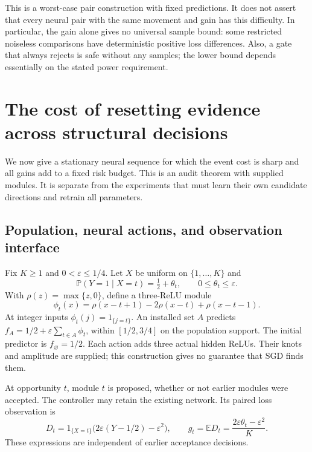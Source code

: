 This is a worst-case pair construction with fixed predictions. It does not
assert that every neural pair with the same movement and gain has this
difficulty. In particular, the gain alone gives no universal sample bound:
some restricted noiseless comparisons have deterministic positive loss
differences. Also, a gate that always rejects is safe without any samples;
the lower bound depends essentially on the stated power requirement.

\section{The cost of resetting evidence across structural decisions}
\label{sec:reset-theory}

We now give a stationary neural sequence for which the event cost is
sharp and all gains add to a fixed risk budget. This is an audit theorem
with supplied modules. It is separate from the experiments that must learn
their own candidate directions and retrain all parameters.

\subsection{Population, neural actions, and observation interface}

Fix $K\ge1$ and $0<\varepsilon\le1/4$. Let $X$ be uniform on
$\{1,\ldots,K\}$ and
\begin{equation}
 \mathbb P(Y=1\mid X=t)=\tfrac12+\theta_t,
 \qquad 0\le\theta_t\le\varepsilon.
 \label{eq:module-law}
\end{equation}
With $\rho(z)=\max\{z,0\}$, define a three-ReLU module
\begin{equation}
 \phi_t(x)=\rho(x-t+1)-2\rho(x-t)+\rho(x-t-1).
 \label{eq:relu-module}
\end{equation}
At integer inputs $\phi_t(j)=1_{\{j=t\}}$.
An installed set $A$ predicts
$f_A=1/2+\varepsilon\sum_{t\in A}\phi_t$, within $[1/2,3/4]$ on the
population support. The initial predictor is $f_\varnothing=1/2$.
Each action adds three actual hidden ReLUs. Their knots and amplitude
are supplied; this construction gives no guarantee that SGD finds them.

At opportunity $t$, module $t$ is proposed, whether or not earlier modules
were accepted. The controller may retain the existing network. Its paired
loss observation is
\begin{equation}
 D_t=1_{\{X=t\}}\bigl(2\varepsilon(Y-1/2)-\varepsilon^2\bigr),
 \qquad g_t=\mathbb ED_t
   =\frac{2\varepsilon\theta_t-\varepsilon^2}{K}.
 \label{eq:module-difference}
\end{equation}
These expressions are independent of earlier acceptance decisions.

